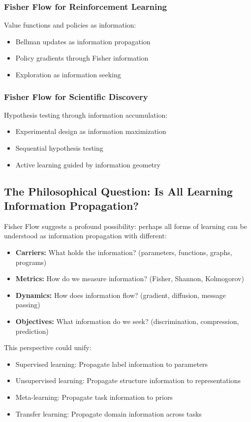 \documentclass[11pt]{article}
\begin{document}
\subsubsection{Fisher Flow for Reinforcement Learning}
Value functions and policies as information:
\begin{itemize}
\item Bellman updates as information propagation
\item Policy gradients through Fisher information
\item Exploration as information seeking
\end{itemize}

\subsubsection{Fisher Flow for Scientific Discovery}
Hypothesis testing through information accumulation:
\begin{itemize}
\item Experimental design as information maximization
\item Sequential hypothesis testing
\item Active learning guided by information geometry
\end{itemize}

\subsection{The Philosophical Question: Is All Learning Information Propagation?}

Fisher Flow suggests a profound possibility: perhaps all forms of learning can be understood as information propagation with different:
\begin{itemize}
\item \textbf{Carriers:} What holds the information? (parameters, functions, graphs, programs)
\item \textbf{Metrics:} How do we measure information? (Fisher, Shannon, Kolmogorov)
\item \textbf{Dynamics:} How does information flow? (gradient, diffusion, message passing)
\item \textbf{Objectives:} What information do we seek? (discrimination, compression, prediction)
\end{itemize}

This perspective could unify:
\begin{itemize}
\item Supervised learning: Propagate label information to parameters
\item Unsupervised learning: Propagate structure information to representations
\item Meta-learning: Propagate task information to priors
\item Transfer learning: Propagate domain information across tasks
\end{itemize}
\end{document}
